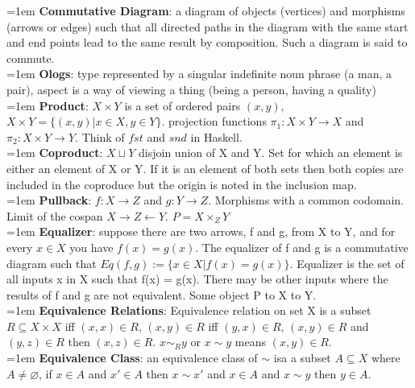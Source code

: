 \documentclass[11pt, oneside]{article}   	%
\begin{document}
\hangindent=1em
\textbf{Commutative Diagram}: a diagram of objects (vertices) and morphisms (arrows or edges) such that all directed paths in the diagram with the same start and end points lead to the same result by composition. Such a diagram is said to commute. \\

\hangindent=1em
\textbf{Ologs}: type represented by a singular indefinite noun phrase (a man, a pair), aspect is a way of viewing  a thing (being a person, having a quality) \\

\hangindent=1em
\textbf{Product}: $X \times Y$ is a set of ordered pairs $(x,y)$, $X \times Y = \{(x,y) | x \in X, y \in Y\}$. projection functions $\pi_{1}: X \times Y \rightarrow X$ and $\pi_{2}: X \times Y \rightarrow Y$. Think of $fst$ and $snd$ in Haskell. \\

\hangindent=1em
\textbf{Coproduct}: $X \sqcup Y $  disjoin union of X and Y. Set for which an element is either an element of X or Y. If it is an element of both sets then both copies are included in the coproduce but the origin is noted in the inclusion map. \\

\hangindent=1em
\textbf{Pullback}: $f: X \rightarrow Z$ and $g: Y \rightarrow Z$. Morphisms with a common codomain. Limit of the cospan $X \rightarrow Z \leftarrow Y$. $P = X \times_{Z} Y$ \\

\hangindent=1em
\textbf{Equalizer}: suppose there are two arrows, f and g, from X to Y, and for every $x \in X$ you have $f(x) = g(x)$. The equalizer of f and g is a commutative diagram such that $Eq(f,g) := \{x \in X | f(x) = g(x)\}$. Equalizer is the set of all inputs x in X such that f(x) = g(x). There may be other inputs where the results of f and g are not equivalent. Some object P to X to Y. \\

\hangindent=1em
\textbf{Equivalence Relations}: Equivalence relation on set X is a subset $ R \subseteq X \times X $ iff $(x,x) \in R$, $(x,y) \in R$ iff $(y,x) \in R$, $(x,y) \in R$ and $(y,z) \in R$ then $(x,z) \in R$. $x \sim_R y$ or $x \sim y$ means $(x,y) \in R$. \\

\hangindent=1em
\textbf{Equivalence Class}: an equivalence class of $\sim$ isa a subset $A \subseteq X$ where $A \neq \varnothing$, if $x \in A$ and $x' \in A$ then $x \sim x'$ and $x \in A$ and $x \sim y$ then $y \in A$. \\ 
\end{document}
